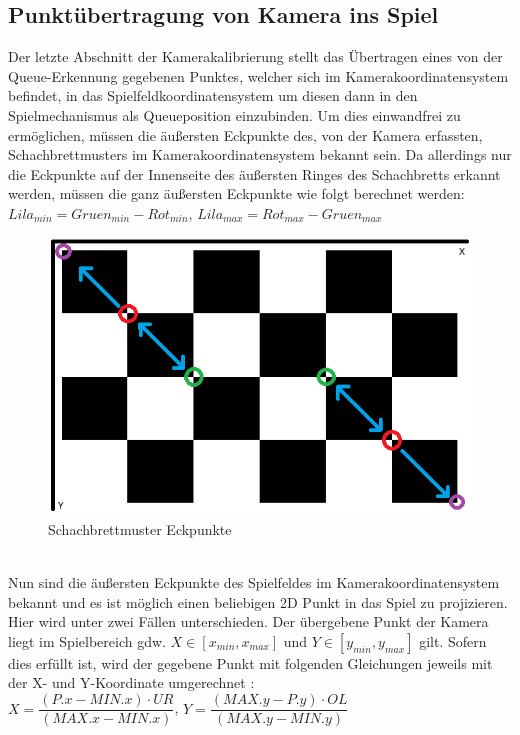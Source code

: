 \subsection{Punktübertragung von Kamera ins Spiel}
Der letzte Abschnitt der Kamerakalibrierung stellt das Übertragen eines von der Queue-Erkennung gegebenen Punktes, welcher sich im Kamerakoordinatensystem befindet, in das Spielfeldkoordinatensystem um diesen dann in den Spielmechanismus als Queueposition einzubinden.
Um dies einwandfrei zu ermöglichen, müssen die äußersten Eckpunkte des, von der Kamera erfassten, Schachbrettmusters im Kamerakoordinatensystem bekannt sein. Da allerdings nur die Eckpunkte auf der Innenseite des äußersten Ringes des Schachbretts erkannt werden, müssen die ganz äußersten Eckpunkte wie folgt berechnet werden:\\
$Lila_{min} = Gruen_{min} - Rot_{min}$, 
$Lila_{max} = Rot_{max} - Gruen_{max}$
\begin{figure}[h]
	\centering
	\includegraphics[scale=0.7]{bilder/schachbrettdiff.png}
	\caption{Schachbrettmuster Eckpunkte}
\end{figure}\\
Nun sind die äußersten Eckpunkte des Spielfeldes im Kamerakoordinatensystem bekannt und es ist möglich einen beliebigen 2D Punkt in das Spiel zu projizieren. Hier wird unter zwei Fällen unterschieden. Der übergebene Punkt der Kamera liegt im Spielbereich gdw. $X \in [x_{min}, x_{max}]$ und $Y \in [y_{min},y_{max}]$ gilt.
Sofern dies erfüllt ist, wird der gegebene Punkt mit folgenden Gleichungen jeweils mit der X- und Y-Koordinate umgerechnet :\\
$X = \dfrac{(P.x - MIN.x) \cdot UR}{(MAX.x - MIN.x)}$, 
$Y = \dfrac{(MAX.y - P.y) \cdot OL}{(MAX.y - MIN.y)}$
